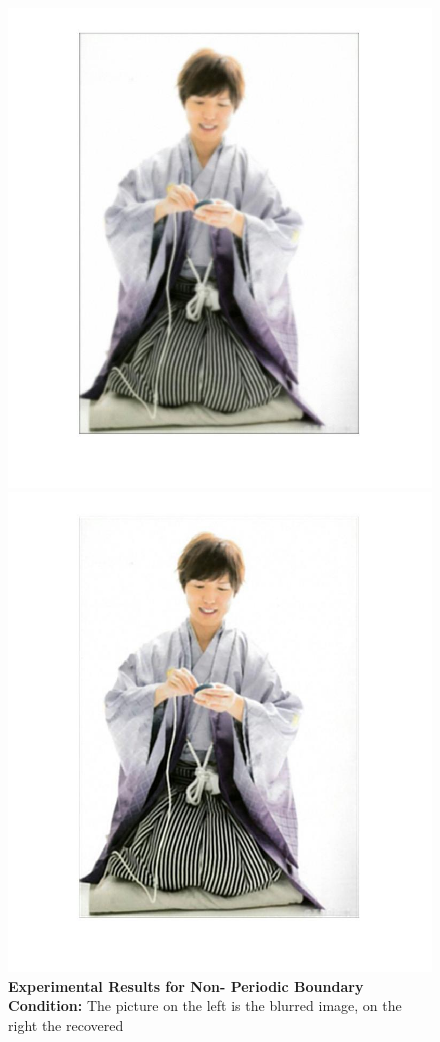 \documentclass{article}
\theoremstyle{plain} \newtheorem{thm}{Theorem}
\begin{document}
\begin{figure}
	\caption{\textbf{Experimental Results for Non- Periodic Boundary Condition:} The picture on the left is the blurred image, on the right the recovered}
	\begin{minipage}{.5\linewidth}
		\includegraphics[width=\textwidth]{kamiya_blurred.jpg}
	\end{minipage}
	\begin{minipage}{.5\linewidth}
		\includegraphics[width=\linewidth]{kamiya_recovered.jpg}

\end{minipage}
\end{figure}
\end{document}
